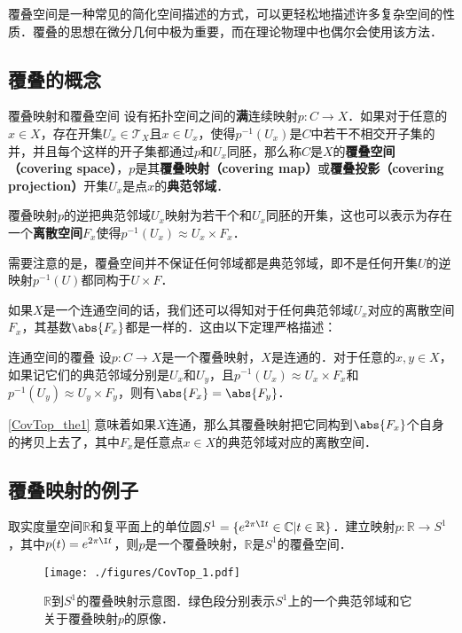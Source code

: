 

覆叠空间是一种常见的简化空间描述的方式，可以更轻松地描述许多复杂空间的性质．覆叠的思想在微分几何中极为重要，而在理论物理中也偶尔会使用该方法．

\subsection{覆叠的概念}
\begin{definition}{覆叠映射和覆叠空间}\label{CovTop_def1}
设有拓扑空间之间的\textbf{满}连续映射$p:C\rightarrow X$．如果对于任意的$x\in X$，存在开集$U_x\in\mathcal{T}_X$且$x\in U_x$，使得$p^{-1}(U_x)$是$C$中若干不相交开子集的并，并且每个这样的开子集都通过$p$和$U_x$同胚，那么称$C$是$X$的\textbf{覆叠空间（covering space）}，$p$是其\textbf{覆叠映射（covering map）}或\textbf{覆叠投影（covering projection）}开集$U_x$是点$x$的\textbf{典范邻域}．
\end{definition} 

覆叠映射$p$的逆把典范邻域$U_x$映射为若干个和$U_x$同胚的开集，这也可以表示为存在一个\textbf{离散空间}$F_x$使得$p^{-1}(U_x)\approx U_x\times F_x$．

需要注意的是，覆叠空间并不保证任何邻域都是典范邻域，即不是任何开集$U$的逆映射$p^{-1}(U)$都同构于$U\times F$．

如果$X$是一个连通空间的话，我们还可以得知对于任何典范邻域$U_x$对应的离散空间$F_x$，其基数$\abs{F_x}$都是一样的．这由以下定理严格描述：

\begin{theorem}{连通空间的覆叠}\label{CovTop_the1}
设$p:C\rightarrow X$是一个覆叠映射，$X$是连通的．对于任意的$x, y\in X$，如果记它们的典范邻域分别是$U_x$和$U_y$，且$p^{-1}(U_x)\approx U_x\times F_x$和$p^{-1}(U_y)\approx U_y\times F_y$，则有$\abs{F_x}=\abs{F_y}$．
\end{theorem}

\autoref{CovTop_the1} 意味着如果$X$连通，那么其覆叠映射把它同构到$\abs{F_x}$个自身的拷贝上去了，其中$F_x$是任意点$x\in X$的典范邻域对应的离散空间．

\subsection{覆叠映射的例子}

\begin{example}{}
取实度量空间$\mathbb{R}$和复平面上的单位圆$S^1=\{e^{2\pi\I t}\in\mathbb{C}|t\in\mathbb{R}\}$．建立映射$p:\mathbb{R}\rightarrow S^1$，其中$p(t)=e^{2\pi\I t}$，则$p$是一个覆叠映射，$\mathbb{R}$是$S^1$的覆叠空间．

\begin{figure}[ht]
\centering
\texttt{[image: ./figures/CovTop\_1.pdf]}
\caption{$\mathbb{R}$到$S^1$的覆叠映射示意图．绿色段分别表示$S^1$上的一个典范邻域和它关于覆叠映射$p$的原像．} \label{CovTop_fig1}
\end{figure}

\end{example}


